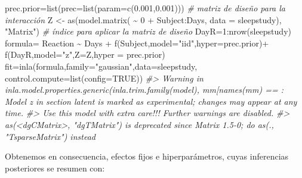 \documentclass[
]{book}
\newenvironment{Shaded}{\begin{snugshade}}{\end{snugshade}}
\newcommand{\AttributeTok}[1]{\textcolor[rgb]{0.77,0.63,0.00}{#1}}
\newcommand{\CommentTok}[1]{\textcolor[rgb]{0.56,0.35,0.01}{\textit{#1}}}
\newcommand{\ConstantTok}[1]{\textcolor[rgb]{0.00,0.00,0.00}{#1}}
\newcommand{\DecValTok}[1]{\textcolor[rgb]{0.00,0.00,0.81}{#1}}
\newcommand{\FloatTok}[1]{\textcolor[rgb]{0.00,0.00,0.81}{#1}}
\newcommand{\FunctionTok}[1]{\textcolor[rgb]{0.00,0.00,0.00}{#1}}
\newcommand{\NormalTok}[1]{#1}
\newcommand{\OtherTok}[1]{\textcolor[rgb]{0.56,0.35,0.01}{#1}}
\newcommand{\SpecialCharTok}[1]{\textcolor[rgb]{0.00,0.00,0.00}{#1}}
\newcommand{\StringTok}[1]{\textcolor[rgb]{0.31,0.60,0.02}{#1}}
\begin{document}
\begin{Shaded}
\begin{Highlighting}[]
\NormalTok{prec.prior}\OtherTok{=}\FunctionTok{list}\NormalTok{(}\AttributeTok{prec=}\FunctionTok{list}\NormalTok{(}\AttributeTok{param=}\FunctionTok{c}\NormalTok{(}\FloatTok{0.001}\NormalTok{,}\FloatTok{0.001}\NormalTok{)))}
\CommentTok{\# matriz de diseño para la interacción}
\NormalTok{Z }\OtherTok{\textless{}{-}} \FunctionTok{as}\NormalTok{(}\FunctionTok{model.matrix}\NormalTok{( }\SpecialCharTok{\textasciitilde{}} \DecValTok{0} \SpecialCharTok{+}\NormalTok{ Subject}\SpecialCharTok{:}\NormalTok{Days, }\AttributeTok{data =}\NormalTok{ sleepstudy), }\StringTok{"Matrix"}\NormalTok{)}
\CommentTok{\# índice para aplicar la matriz de diseño}
\NormalTok{DayR}\OtherTok{=}\DecValTok{1}\SpecialCharTok{:}\FunctionTok{nrow}\NormalTok{(sleepstudy)}
\NormalTok{formula}\OtherTok{=}\NormalTok{ Reaction }\SpecialCharTok{\textasciitilde{}}\NormalTok{ Days }\SpecialCharTok{+} \FunctionTok{f}\NormalTok{(Subject,}\AttributeTok{model=}\StringTok{"iid"}\NormalTok{,}\AttributeTok{hyper=}\NormalTok{prec.prior)}\SpecialCharTok{+}
  \FunctionTok{f}\NormalTok{(DayR,}\AttributeTok{model=}\StringTok{"z"}\NormalTok{,}\AttributeTok{Z=}\NormalTok{Z,}\AttributeTok{hyper =}\NormalTok{ prec.prior) }
\NormalTok{fit}\OtherTok{=}\FunctionTok{inla}\NormalTok{(formula,}\AttributeTok{family=}\StringTok{"gaussian"}\NormalTok{,}\AttributeTok{data=}\NormalTok{sleepstudy,}
         \AttributeTok{control.compute=}\FunctionTok{list}\NormalTok{(}\AttributeTok{config=}\ConstantTok{TRUE}\NormalTok{))}
\CommentTok{\#\textgreater{} Warning in inla.model.properties.generic(inla.trim.family(model), mm[names(mm) == : Model \textquotesingle{}z\textquotesingle{} in section \textquotesingle{}latent\textquotesingle{} is marked as \textquotesingle{}experimental\textquotesingle{}; changes may appear at any time.}
\CommentTok{\#\textgreater{}   Use this model with extra care!!! Further warnings are disabled.}
\CommentTok{\#\textgreater{} as(\textless{}dgCMatrix\textgreater{}, "dgTMatrix") is deprecated since Matrix 1.5{-}0; do as(., "TsparseMatrix") instead}
\end{Highlighting}
\end{Shaded}

Obtenemos en consecuencia, efectos fijos e hiperparámetros, cuyas inferencias posteriores se resumen con:
\end{document}
